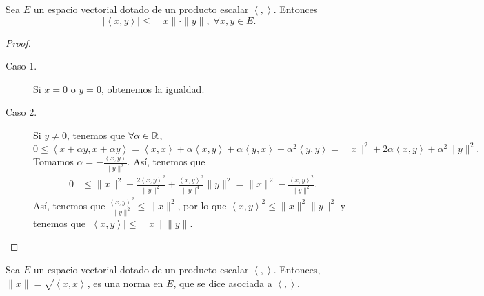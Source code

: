 \begin{theorem}
Sea $\displaystyle E $ un espacio vectorial dotado de un producto escalar $\displaystyle \left\langle ,  \right\rangle  $. Entonces
\[|\left\langle x, y \right\rangle| \leq \| x \| \cdot \|y\|, \; \forall x,y \in E .\]
\end{theorem}
\begin{proof}
\begin{description}
\item[Caso 1.] Si $\displaystyle x = 0 $ o $\displaystyle y = 0 $, obtenemos la igualdad.
\item[Caso 2.] Si $\displaystyle y \neq 0 $, tenemos que $\displaystyle \forall \alpha \in \mathbb{R} $,
	\[0 \leq \left\langle x + \alpha y, x + \alpha y \right\rangle = \left\langle x, x \right\rangle +\alpha \left\langle x, y \right\rangle +\alpha \left\langle y, x \right\rangle +\alpha ^{2}\left\langle y, y \right\rangle  = \|x\|^{2} + 2\alpha \left\langle x, y \right\rangle +\alpha ^{2} \|y\|^{2} .\]
	Tomamos $\displaystyle \alpha = -\frac{\left\langle x, y \right\rangle }{\|y\|^{2}} $. Así, tenemos que 
	\[
	\begin{split}
		0 & \leq \|x\|^{2} - \frac{2\left\langle x, y \right\rangle ^{2}}{\|y\|^{2}} + \frac{\left\langle x, y \right\rangle ^{2}}{\|y\|^{4}}\|y\|^{2} = \|x\|^{2} - \frac{\left\langle x, y \right\rangle ^{2}}{\|y\|^{2}} .
	\end{split}
	\]
Así, tenemos que $\displaystyle \frac{\left\langle x, y \right\rangle ^{2}}{\|y\|^{2}} \leq \|x\|^{2} $, por lo que $\displaystyle \left\langle x, y \right\rangle ^{2} \leq \|x\|^{2}\|y\|^{2} $ y tenemos que $\displaystyle \left|\left\langle x, y \right\rangle \right| \leq \|x\|\|y\| $.	
\end{description}
\end{proof}
\begin{prop}
Sea $\displaystyle E $ un espacio vectorial dotado de un producto escalar $\displaystyle \left\langle ,  \right\rangle  $. Entonces, $\displaystyle \|x\| = \sqrt{\left\langle x, x \right\rangle } $, es una norma en $\displaystyle E $, que se dice asociada a $\displaystyle \left\langle ,  \right\rangle  $.
\end{prop}

